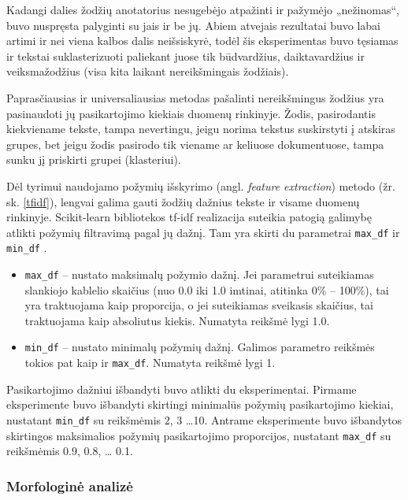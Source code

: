\documentclass{VUMIFInfBakalaurinis}
\begin{document}
Kadangi dalies žodžių anotatorius nesugebėjo atpažinti ir pažymėjo
„nežinomas“, buvo nuspręsta palyginti su jais ir be jų. Abiem atvejais
rezultatai buvo labai artimi ir nei viena kalbos dalis neišsiskyrė,
todėl šis eksperimentas buvo tęsiamas ir tekstai suklasterizuoti
paliekant juose tik būdvardžius, daiktavardžius ir veiksmažodžius (visa
kita laikant nereikšmingais žodžiais).

\label{freq}

Paprasčiausias ir universaliausias metodas pašalinti nereikšmingus
žodžius yra pasinaudoti jų pasikartojimo kiekiais duomenų rinkinyje.
Žodis, pasirodantis kiekviename tekste, tampa nevertingu, jeigu norima
tekstus suskirstyti į atskiras grupes, bet jeigu žodis pasirodo tik viename ar
keliuose dokumentuose, tampa sunku jį priskirti grupei (klasteriui).

Dėl tyrimui naudojamo požymių išskyrimo (angl. \emph{feature
extraction}) metodo (žr. sk. \ref{tfidf}), lengvai galima gauti žodžių dažnius
tekste ir visame duomenų rinkinyje. Scikit-learn bibliotekos tf-idf
realizacija suteikia patogią galimybę atlikti požymių filtravimą pagal
jų dažnį. Tam yra skirti du parametrai \texttt{max\_df} ir
\texttt{min\_df} .

\begin{itemize}
\item
  \texttt{max\_df} -- nustato maksimalų požymio dažnį. Jei parametrui
  suteikiamas slankiojo kablelio skaičius (nuo 0.0 iki 1.0 imtinai,
  atitinka 0\% -- 100\%), tai yra traktuojama kaip proporcija, o jei
  suteikiamas sveikasis skaičius, tai traktuojama kaip absoliutus
  kiekis. Numatyta reikšmė lygi 1.0.
\item
  \texttt{min\_df} -- nustato minimalų požymių dažnį. Galimos parametro
  reikšmės tokios pat kaip ir \texttt{max\_df}. Numatyta reikšmė lygi 1.
\end{itemize}

Pasikartojimo dažniui išbandyti buvo atlikti du eksperimentai. Pirmame
eksperimente buvo išbandyti skirtingi minimalūs požymių pasikartojimo
kiekiai, nustatant \texttt{min\_df} su reikšmėmis 2, 3 \ldots 10. Antrame
eksperimente buvo išbandytos skirtingos maksimalios požymių
pasikartojimo proporcijos, nustatant \texttt{max\_df} su reikšmėmis 0.9, 0.8, \ldots
0.1.

\subsubsection{Morfologinė analizė}
\end{document}
